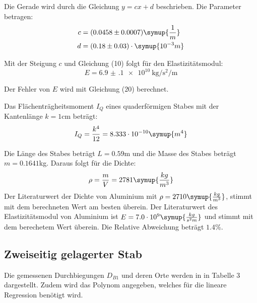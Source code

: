 Die Gerade wird durch die Gleichung $y = cx + d$ beschrieben. Die Parameter betragen:
\begin{align*}
  c &= (0.0458 \pm 0.0007) \symup{\frac{1}{m}} \\
  d &= (0.18  \pm 0.03)   \cdot \symup{10^{-3}m}
\end{align*}


Mit der Steigung $c$ und Gleichung (10) folgt für den Elastizitätsmodul:
\begin{equation}
  E = \SI{6.9(1)e10}{\kilo\gram\per\second\squared\per\meter}
\end{equation}

Der Fehler von $E$ wird mit Gleichung (20) berechnet.

Das Flächenträgheitsmoment $I_Q$ eines quaderförmigen Stabes mit der Kantenlänge
$k = 1$cm beträgt:
\begin{equation}
  I_Q = \frac{k^4}{12} = 8.333 \cdot 10^{-10} \symup{m^4}
\end{equation}


Die Länge des Stabes beträgt $L = 0.59$m und die Masse des Stabes beträgt $m = 0.1641$kg.
Daraus folgt für die Dichte:
\begin{equation}
  \rho = \frac{m}{V} = 2781 \symup{\frac{kg}{m^3}}
\end{equation}
Der Literaturwert der Dichte von Aluminium mit $\rho = 2710 \symup{\frac{kg}{m^3}}$,
stimmt mit dem berechneten Wert am besten überein. Der Literaturwert des Elastizitätsmodul
von Aluminium ist $E = 7.0 \cdot 10^{9} \symup{\frac{kg}{s^2m}}$ und stimmt mit dem berechetem Wert
überein. Die Relative Abweichung beträgt $1.4 \%$.

\subsection{Zweiseitig gelagerter Stab}
Die gemessenen Durchbiegungen $D_{B1}$ und deren Orte werden in in Tabelle 3 dargestellt. Zudem wird
das Polynom angegeben, welches für die lineare Regression benötigt wird.

